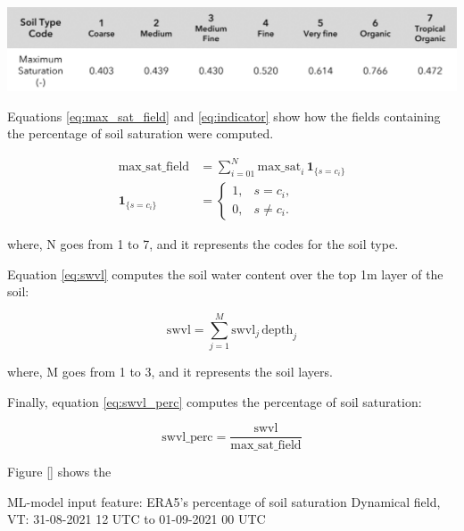 \begin{table}[htbp]
\centering
{}
\includegraphics[width=\textwidth]{03_max_saturation.png}
\label{table:max_saturation}
\end{table}

Equations \ref{eq:max_sat_field} and \ref{eq:indicator} show how the fields containing the percentage of soil saturation were computed. 

\begin{align}
\text{max\_sat\_field}
  &= \sum_{i=01}^{N} \text{max\_sat}_i \,\mathbf{1}_{\{s=c_i\}}
     \label{eq:max_sat_field}\\
\mathbf{1}_{\{s=c_i\}}
  &=
  \begin{cases}
    1, & s=c_i,\\
    0, & s\neq c_i.
  \end{cases}
    \label{eq:indicator}
\end{align}

where, N goes from 1 to 7, and it represents the codes for the soil type.

Equation \ref{eq:swvl} computes the soil water content over the top 1m layer of the soil:

\begin{equation}
\label{eq:swvl}
\text{swvl} = \sum_{j=1}^{M} \text{swvl}_{j}\, \text{depth}_{j}
\end{equation}

where, M goes from 1 to 3, and it represents the soil layers.

Finally, equation \ref{eq:swvl_perc} computes the percentage of soil saturation:

\begin{equation}
\label{eq:swvl_perc}
\text{swvl\_perc} = \frac{\text{swvl}}{\text{max\_sat\_field}}
\end{equation}

Figure \ref{} shows the 

ML-model input feature: ERA5’s percentage of soil saturation
Dynamical field, VT: 31-08-2021 12 UTC to 01-09-2021 00 UTC


